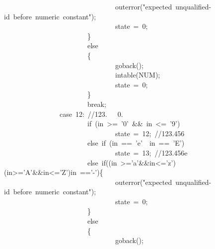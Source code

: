 \documentclass{article}
\begin{document}
\begin{mdpre}
~~~~~~~~~~~~~~~~~~~~~~~~~~~~~~~~outerror({"}{expected~unqualified-id~before~numeric~constant}{"});\\
~~~~~~~~~~~~~~~~~~~~~~~~~~~~~~~~state~=~{0};\\
~~~~~~~~~~~~~~~~~~~~~~~~\}\\
~~~~~~~~~~~~~~~~~~~~~~~~{else}\\
~~~~~~~~~~~~~~~~~~~~~~~~\{\\
~~~~~~~~~~~~~~~~~~~~~~~~~~~~~~~~goback();\\
~~~~~~~~~~~~~~~~~~~~~~~~~~~~~~~~intable({NUM});\\
~~~~~~~~~~~~~~~~~~~~~~~~~~~~~~~~state~=~{0};\\
~~~~~~~~~~~~~~~~~~~~~~~~\}\\
~~~~~~~~~~~~~~~~~~~~~~~~{break};\\
~~~~~~~~~~~~~~~~{case}~{12}:~{//123.~~~0.}\\
~~~~~~~~~~~~~~~~~~~~~~~~{if}~(in~\textgreater{}=~{'0'}~\&\&~in~\textless{}=~{'9'})\\
~~~~~~~~~~~~~~~~~~~~~~~~~~~~~~~~state~=~{12};~{//123.456}\\
~~~~~~~~~~~~~~~~~~~~~~~~{else}~{if}~(in~==~{'e'}~\textbar{}\textbar{}~in~==~{'E'})\\
~~~~~~~~~~~~~~~~~~~~~~~~~~~~~~~~state~=~{13};~{//123.456e}\\
~~~~~~~~~~~~~~~~~~~~~~~~{else}~{if}((in~\textgreater{}={'a'}\&\&in\textless{}={'z'})\textbar{}\textbar{}(in\textgreater{}={'A'}\&\&in\textless{}={'Z'})\textbar{}\textbar{}in~=={'-'})\{\\
~~~~~~~~~~~~~~~~~~~~~~~~~~~~~~~~outerror({"}{expected~unqualified-id~before~numeric~constant}{"});\\
~~~~~~~~~~~~~~~~~~~~~~~~~~~~~~~~state~=~{0};\\
~~~~~~~~~~~~~~~~~~~~~~~~\}\\
~~~~~~~~~~~~~~~~~~~~~~~~{else}\\
~~~~~~~~~~~~~~~~~~~~~~~~\{\\
~~~~~~~~~~~~~~~~~~~~~~~~~~~~~~~~goback();\\

\end{mdpre}
\end{document}
